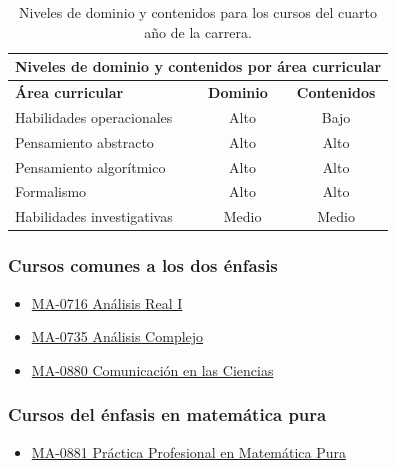 \begin{table}[H]
\begin{center}
\begin{tabular}{|ccc|}
\hline
\multicolumn{3}{|c|}{\cellcolor[HTML]{00C0F3} \textbf{Niveles de dominio y contenidos por área curricular}} \\ \hline
\multicolumn{1}{|l|}{\cellcolor[HTML]{8ED8F8}\textbf{Área curricular}} & \multicolumn{1}{l|}{\cellcolor[HTML]{8ED8F8}\textbf{Dominio}} & \cellcolor[HTML]{8ED8F8}\textbf{Contenidos} \\ \hline
\multicolumn{1}{|l|}{Habilidades operacionales} & \multicolumn{1}{c|}{Alto} & Bajo \\ \hline
\multicolumn{1}{|l|}{Pensamiento abstracto} & \multicolumn{1}{c|}{Alto} & Alto \\ \hline
\multicolumn{1}{|l|}{Pensamiento algorítmico} & \multicolumn{1}{c|}{Alto} & Alto \\ \hline
\multicolumn{1}{|l|}{Formalismo} & \multicolumn{1}{c|}{Alto} & Alto \\ \hline
\multicolumn{1}{|l|}{Habilidades investigativas} & \multicolumn{1}{c|}{Medio} & Medio \\ \hline
\end{tabular}
\end{center}
\caption{Niveles de dominio y contenidos para los cursos del cuarto año de la carrera.}
\end{table}

\subsubsection*{Cursos comunes a los dos énfasis}

\begin{itemize}
    \item \hyperlink{MA0716}{MA-0716 Análisis Real I}
    \item \hyperlink{MA0735}{MA-0735 Análisis Complejo}
    \item \hyperlink{MA0880}{MA-0880 Comunicación en las Ciencias}
\end{itemize}

\subsubsection*{Cursos del énfasis en matemática pura}
\begin{itemize}
    \item \hyperlink{MA0881Pura}{MA-0881 Práctica Profesional en Matemática Pura}
\end{itemize}

